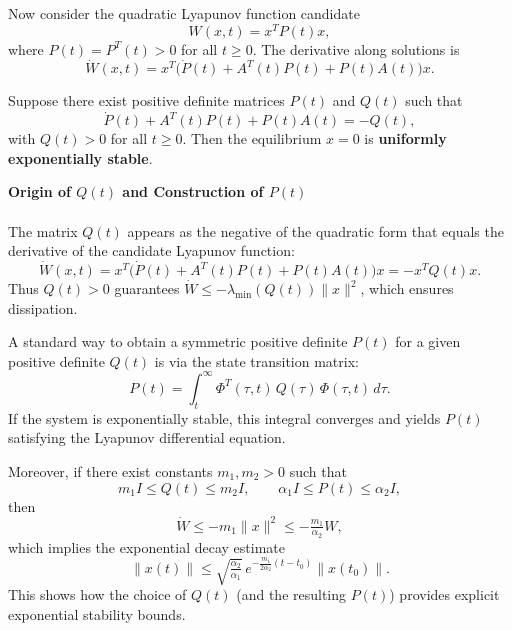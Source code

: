 Now consider the quadratic Lyapunov function candidate
\[
W(x,t) = x^T P(t) x,
\]
where $P(t)=P^T(t)>0$ for all $t\ge 0$.  
The derivative along solutions is
\[
\dot{W}(x,t) = x^T \big( \dot{P}(t) + A^T(t)P(t) + P(t)A(t) \big) x.
\]

\begin{theorem}
Suppose there exist positive definite matrices $P(t)$ and $Q(t)$ such that
\[
\dot{P}(t) + A^T(t)P(t) + P(t)A(t) = -Q(t),
\]
with $Q(t)>0$ for all $t\ge 0$.  
Then the equilibrium $x=0$ is \textbf{uniformly exponentially stable}.
\end{theorem}

\begin{remark}\textbf{Origin of $Q(t)$ and Construction of $P(t)$}
\\\\The matrix $Q(t)$ appears as the negative of the quadratic form that equals the derivative of the candidate Lyapunov function:
\[
\dot W(x,t) = x^T\big(\dot P(t)+A^T(t)P(t)+P(t)A(t)\big)x = -x^T Q(t)x.
\]
Thus $Q(t)>0$ guarantees $\dot W \le -\lambda_{\min}(Q(t))\|x\|^2$, which ensures dissipation.

A standard way to obtain a symmetric positive definite $P(t)$ for a given positive definite $Q(t)$ is via the state transition matrix:
\[
P(t) = \int_{t}^{\infty} \Phi^T(\tau,t)\,Q(\tau)\,\Phi(\tau,t)\,d\tau.
\]
If the system is exponentially stable, this integral converges and yields $P(t)$ satisfying the Lyapunov differential equation.

Moreover, if there exist constants $m_1,m_2>0$ such that
\[
m_1 I \le Q(t) \le m_2 I, 
\qquad \alpha_1 I \le P(t) \le \alpha_2 I,
\]
then
\[
\dot W \le -m_1 \|x\|^2 \le -\tfrac{m_1}{\alpha_2}W,
\]
which implies the exponential decay estimate
\[
\|x(t)\| \le \sqrt{\tfrac{\alpha_2}{\alpha_1}} \, e^{-\tfrac{m_1}{2\alpha_2}(t-t_0)} \|x(t_0)\|.
\]
This shows how the choice of $Q(t)$ (and the resulting $P(t)$) provides explicit exponential stability bounds.
\end{remark}

